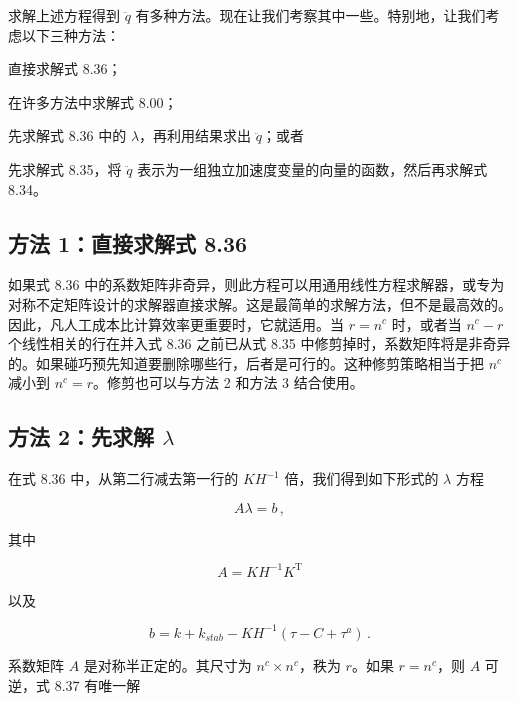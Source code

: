 \documentclass[10pt,a4paper]{book}
\theoremstyle{thmstyle} %
\theoremstyle{defstyle} %
\theoremstyle{prostyle} %
\begin{document}
求解上述方程得到 $\ddot{q}$ 有多种方法。现在让我们考察其中一些。特别地，让我们考虑以下三种方法：



直接求解式 8.36；



在许多方法中求解式 8.00；



先求解式 8.36 中的 $\lambda$，再利用结果求出 $\ddot{q}$；或者



先求解式 8.35，将 $\ddot{q}$ 表示为一组独立加速度变量的向量的函数，然后再求解式 8.34。



\subsection{方法 1：直接求解式 8.36}





如果式 8.36 中的系数矩阵非奇异，则此方程可以用通用线性方程求解器，或专为对称不定矩阵设计的求解器直接求解。这是最简单的求解方法，但不是最高效的。因此，凡人工成本比计算效率更重要时，它就适用。当 $r = n^c$ 时，或者当 $n^c - r$ 个线性相关的行在并入式 8.36 之前已从式 8.35 中修剪掉时，系数矩阵将是非奇异的。如果碰巧预先知道要删除哪些行，后者是可行的。这种修剪策略相当于把 $n^c$ 减小到 $n^c = r$。修剪也可以与方法 2 和方法 3 结合使用。



\subsection{方法 2：先求解 $\lambda$}





在式 8.36 中，从第二行减去第一行的 $KH^{-1}$ 倍，我们得到如下形式的 $\lambda$ 方程



$$
A \lambda = b \, ,
$$



其中



$$
A = K H ^{- 1} K ^{\mathrm { T} }
$$



以及



$$
b = k + k _ { s t a b } - K H ^{- 1} ( \tau - C + \tau ^{a} ) \, .
$$



系数矩阵 $A$ 是对称半正定的。其尺寸为 $n^{c} \times n^{c}$，秩为 $r$。如果 $r = n^{c}$，则 $A$ 可逆，式 8.37 有唯一解
\end{document}
